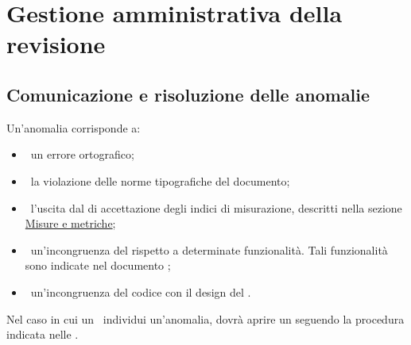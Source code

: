 
\section{Gestione amministrativa della revisione}
\label{gestioneAmministrativaDellaRevisione}
	\subsection{Comunicazione e risoluzione delle anomalie}
	\label{comunicazioneERisoluzioneDelleAnomalie}
		Un'anomalia corrisponde a:
		\begin{itemize}
			\item\ un errore ortografico;
			\item\ la violazione delle norme tipografiche del documento;
			\item\ l'uscita dal  di accettazione degli indici di misurazione, descritti nella sezione \hyperref[misureEMetriche]{Misure e metriche};
			\item\ un'incongruenza del  rispetto a determinate funzionalità. Tali funzionalità sono indicate nel documento \ARdoc;
			\item\ un'incongruenza del codice con il design del .
		\end{itemize}
		Nel caso in cui un \VER\ individui un'anomalia, dovrà aprire un  seguendo la procedura indicata nelle \NPdoc.